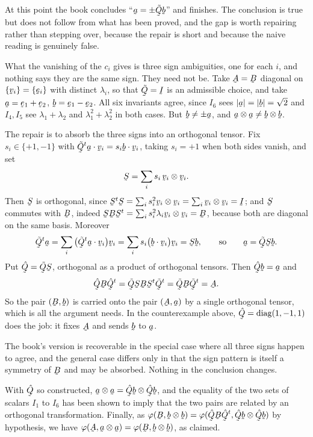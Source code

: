 \begin{remark}
\label{rem:ch9signfix}
At this point the book concludes ``$\ba=\pm\tilde\bQ\bb$'' and finishes.
The conclusion is true but does not follow from what has been proved,
and the gap is worth repairing rather than stepping over, because the
repair is short and because the naive reading is genuinely false.

What the vanishing of the $c_{i}$ gives is three sign ambiguities, one
for each $i$, and nothing says they are the same sign. They need not be.
Take $\bA=\bB$ diagonal on $\{\bv_{i}\}=\{\be_{i}\}$ with distinct
$\lambda_{i}$, so that $\tilde\bQ=\I$ is an admissible choice, and take
$\ba=\be_{1}+\be_{2}$, $\bb=\be_{1}-\be_{2}$. All six invariants agree,
since $I_{6}$ sees $|\ba|=|\bb|=\sqrt2$ and $I_{4},I_{5}$ see
$\lambda_{1}+\lambda_{2}$ and $\lambda_{1}^{2}+\lambda_{2}^{2}$ in both
cases. But $\bb\neq\pm\ba$, and $\ba\otimes\ba\neq\bb\otimes\bb$.

The repair is to absorb the three signs into an orthogonal tensor. Fix
$s_{i}\in\{+1,-1\}$ with $\ip{\tilde\bQ^{t}\ba}{\bv_{i}}
=s_{i}\ip\bb{\bv_{i}}$, taking $s_{i}=+1$ when both sides vanish, and
set
\[
   \bS=\sum_{i}s_{i}\,\bv_{i}\otimes\bv_{i}.
\]
Then $\bS$ is orthogonal, since
$\bS^{t}\bS=\sum_{i}s_{i}^{2}\bv_{i}\otimes\bv_{i}
=\sum_{i}\bv_{i}\otimes\bv_{i}=\I$; and $\bS$ commutes with $\bB$,
indeed $\bS\bB\bS^{t}=\sum_{i}s_{i}^{2}\lambda_{i}
\bv_{i}\otimes\bv_{i}=\bB$, because both are diagonal on the same basis.
Moreover
\[
   \tilde\bQ^{t}\ba=\sum_{i}\big(\ip{\tilde\bQ^{t}\ba}{\bv_{i}}\big)\bv_{i}
   =\sum_{i}s_{i}\big(\ip\bb{\bv_{i}}\big)\bv_{i}=\bS\bb,
   \qquad\text{so}\qquad \ba=\tilde\bQ\bS\bb .
\]
Put $\hat\bQ=\tilde\bQ\bS$, orthogonal as a product of orthogonal
tensors. Then $\hat\bQ\bb=\ba$ and
\[
   \hat\bQ\bB\hat\bQ^{t}=\tilde\bQ\bS\bB\bS^{t}\tilde\bQ^{t}
   =\tilde\bQ\bB\tilde\bQ^{t}=\bA .
\]
So the pair $(\bB,\bb)$ is carried onto the pair $(\bA,\ba)$ by a single
orthogonal tensor, which is all the argument needs. In the
counterexample above, $\hat\bQ=\operatorname{diag}(1,-1,1)$ does the
job: it fixes $\bA$ and sends $\bb$ to $\ba$.

The book's version is recoverable in the special case where all three
signs happen to agree, and the general case differs only in that the
sign pattern is itself a symmetry of $\bB$ and may be absorbed. Nothing
in the conclusion changes.
\end{remark}

With $\hat\bQ$ so constructed, $\ba\otimes\ba
=\hat\bQ\bb\otimes\hat\bQ\bb$, and the equality of the two sets of
scalars $I_{1}$ to $I_{6}$ has been shown to imply that the two pairs
are related by an orthogonal transformation. Finally, as
$\varphi(\bB,\bb\otimes\bb)
=\varphi(\hat\bQ\bB\hat\bQ^{t},\hat\bQ\bb\otimes\hat\bQ\bb)$ by
hypothesis, we have
$\varphi(\bA,\ba\otimes\ba)=\varphi(\bB,\bb\otimes\bb)$, as claimed.

